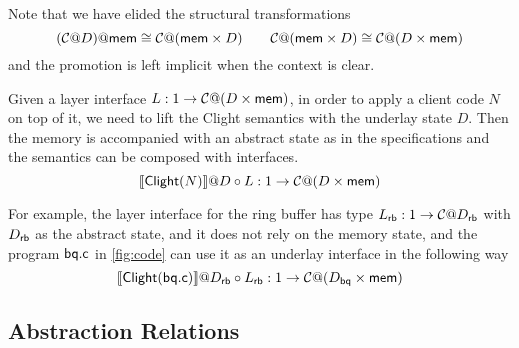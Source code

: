 \documentclass[acmsmall,review,anonymous]{acmart}\settopmatter{printfolios=true,printccs=false,printacmref=false}
\begin{document}
Note that we have elided the structural transformations
\[
  (\mathcal{C}@D)@ \mathsf{mem} 
  \cong
  \mathcal{C}@( \mathsf{mem}  \times D)
    \qquad
  \mathcal{C}@( \mathsf{mem}  \times D)
  \cong
  \mathcal{C}@(D \times  \mathsf{mem} )
\]
and the promotion is left implicit
when the context is clear.


Given a layer interface
$L: 1 \rightarrow \mathcal{C}@(D\times  \mathsf{mem} )$,
in order to apply a client code $N$ on top of it,
we need to lift the Clight semantics
with the underlay state $D$.
Then the memory is accompanied
with an abstract state as in the specifications
and the semantics can be composed with interfaces.
\[
  \llbracket  \mathsf{Clight} (N) \rrbracket @ D \circ L :
  1 \rightarrow \mathcal{C}@(D \times  \mathsf{mem}  )
\]

For example,
the layer interface for the ring buffer
has type
$L_{ \mathsf{rb} }: 1 \rightarrow \mathcal{C}@D_{ \mathsf{rb} }$
with $D_{ \mathsf{rb} }$ as the abstract state,
and it does not rely on the memory state,
and the program $ \mathsf{bq.c} $ in \autoref{fig:code}
can use it as an underlay interface
in the following way
\[
  \llbracket  \mathsf{Clight} ( \mathsf{bq.c} ) \rrbracket
  @ D_{ \mathsf{rb} } \circ L_{ \mathsf{rb} }
  : 1 \rightarrow \mathcal{C}@ (D_{ \mathsf{bq} } \times  \mathsf{mem} )
\]


\subsection{Abstraction Relations} %
\label{sec:ccal:abrel}
\end{document}
